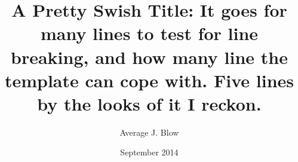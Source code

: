 \documentclass[12pt,a4paper]{book}
\title{A Pretty Swish Title: It goes for many lines to test for line breaking, and how many line the template can cope with. Five lines by the looks of it I reckon.}
\author{Average J. Blow}
\date{September 2014}
\begin{document}
    
\maketitle

\declaration 

\end{document}
